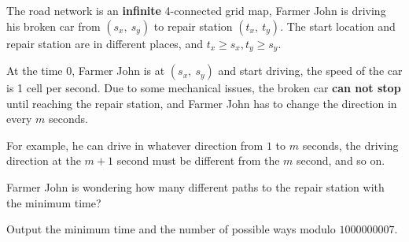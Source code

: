 The road network is an \textbf{infinite} 4-connected grid map, Farmer John is driving his broken car from $(s_x,\ s_y)$ 
to repair station $(t_x,\ t_y)$. The start location and repair station are in different places,
and $t_x \ge s_x, t_y \ge s_y$.

At the time $0$, Farmer John is at $(s_x,\ s_y)$ and start driving, the speed of the car is 1 cell per second.
Due to some mechanical issues, the broken car \textbf{can not stop} until reaching the repair station, and Farmer John has to change the direction in every $m$ seconds.

For example, he can drive in whatever direction from $1$ to $m$ seconds, the driving direction at the $m+1$ second must be different from the $m$ second, and so on.

Farmer John is wondering how many different paths to the repair station with the minimum time?

Output the minimum time and the number of possible ways modulo $1000000007$.
